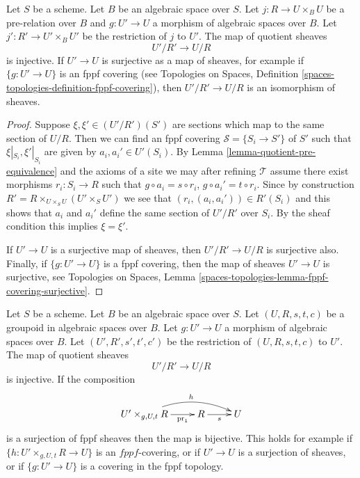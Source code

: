 \begin{lemma}
\label{lemma-quotient-pre-equivalence-relation-restrict}
Let $S$ be a scheme. Let $B$ be an algebraic space over $S$.
Let $j : R \to U\times_B U$ be a pre-relation over $B$
and $g : U' \to U$ a morphism of algebraic spaces over $B$.
Let $j' : R' \to U' \times_B U'$ be the restriction of $j$ to $U'$. 
The map of quotient sheaves
$$
U'/R' \longrightarrow U/R
$$
is injective. If $U' \to U$ is surjective as a map of sheaves, for
example if $\{g : U' \to U\}$ is an fppf covering (see
Topologies on Spaces,
Definition \ref{spaces-topologies-definition-fppf-covering}),
then $U'/R' \to U/R$ is an isomorphism of sheaves.
\end{lemma}

\begin{proof}
Suppose $\xi, \xi' \in (U'/R')(S')$ are sections which
map to the same section of $U/R$.
Then we can find an fppf covering $\mathcal{S} = \{S_i \to S'\}$ of $S'$
such that $\xi|_{S_i}, \xi'|_{S_i}$ are given by $a_i, a_i' \in U'(S_i)$. By
Lemma \ref{lemma-quotient-pre-equivalence}
and the axioms of a site we may after refining
$\mathcal{T}$ assume there exist morphisms $r_i : S_i \to R$
such that $g \circ a_i = s \circ r_i$, $g \circ a_i' = t \circ r_i$.
Since by construction
$R' = R \times_{U \times_S U} (U' \times_S U')$
we see that $(r_i, (a_i, a_i')) \in R'(S_i)$ and this
shows that $a_i$ and $a_i'$ define the same section
of $U'/R'$ over $S_i$. By the sheaf condition this implies
$\xi = \xi'$.

\medskip\noindent
If $U' \to U$ is a surjective map of sheaves, then $U'/R' \to U/R$ is
surjective also. Finally, if $\{g : U' \to U\}$ is a fppf covering, then
the map of sheaves $U' \to U$ is surjective, see
Topologies on Spaces,
Lemma \ref{spaces-topologies-lemma-fppf-covering-surjective}.
\end{proof}

\begin{lemma}
\label{lemma-quotient-groupoid-restrict}
Let $S$ be a scheme. Let $B$ be an algebraic space over $S$.
Let $(U, R, s, t, c)$ be a groupoid in algebraic spaces over $B$.
Let $g : U' \to U$ a morphism of algebraic spaces over $B$.
Let $(U', R', s', t', c')$ be the restriction of $(U, R, s, t, c)$ to $U'$. 
The map of quotient sheaves
$$
U'/R' \longrightarrow U/R
$$
is injective. If the composition
$$
\xymatrix{
U' \times_{g, U, t} R \ar[r]_-{\text{pr}_1} \ar@/^3ex/[rr]^h
& R \ar[r]_s & U
}
$$
is a surjection of fppf sheaves then the map is bijective.
This holds for example if $\{h : U' \times_{g, U, t} R \to U\}$ is an
$fppf$-covering, or if $U' \to U$ is a surjection of sheaves, or if
$\{g : U' \to U\}$ is a covering in the fppf topology.
\end{lemma}

